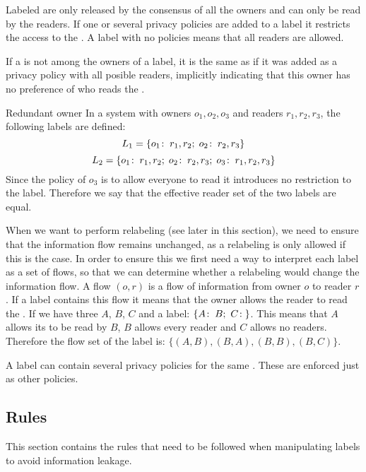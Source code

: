 Labeled \xvalues{} are only released by the consensus of all the owners and can only be read by the readers.
If one or several privacy policies are added to a label it restricts the access to the \xvalue{}.
A label with no policies  means that all readers are allowed.

If a \principal{} is not among the owners of a label, it is the same as if it was added as a privacy policy with all posible readers, implicitly indicating that this owner has no preference of who reads the \xvalue{}.

\begin{example}{Redundant owner}
In a system with owners $o_1, o_2, o_3$ and readers $r_1, r_2, r_3$, the following labels are defined:
$$L_1 = \{o_1\!:\;r_1,r_2;\; o_2\!:\;r_2, r_3\}$$
$$L_2 = \{o_1\!:\;r_1,r_2;\; o_2\!:\;r_2, r_3;\; o_3\!:\;r_1, r_2, r_3\}$$
Since the policy of $o_3$ is to allow everyone to read it introduces no restriction to the label.
Therefore we say that the effective reader set of the two labels are equal.
\end{example}

When we want to perform relabeling (see later in this section), we need to ensure that the information flow remains unchanged, as a relabeling is only allowed if this is the case.
In order to ensure this we first need a way to interpret each label as a set of flows, so that we can determine whether a relabeling would change the information flow.
A flow $(o,r)$ is a flow of information from owner $o$ to reader $r$.
If a label contains this flow it means that the owner allows the reader to read the \xvalue{}.
If we have three \principals{} $A$, $B$, $C$ and a label: $\{\policy{A}{B}; \ \policy{C}{}\}$.
This means that $A$ allows its \xvalue{} to be read by $B$, $B$ allows every reader and $C$ allows no readers.
Therefore the flow set of the label is: $\{(A,B), (B,A), (B,B), (B,C) \}$.

A label can contain several privacy policies for the same \principal{}.
These are enforced just as other policies.

\subsection{Rules}
This section contains the rules that need to be followed when manipulating labels to avoid information leakage.

